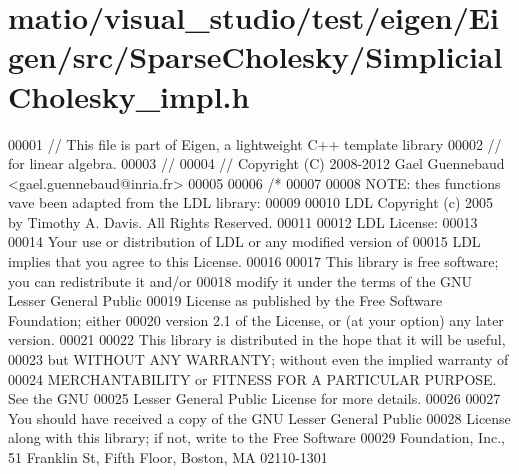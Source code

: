 \hypertarget{matio_2visual__studio_2test_2eigen_2_eigen_2src_2_sparse_cholesky_2_simplicial_cholesky__impl_8h_source}{}\section{matio/visual\+\_\+studio/test/eigen/\+Eigen/src/\+Sparse\+Cholesky/\+Simplicial\+Cholesky\+\_\+impl.h}
\label{matio_2visual__studio_2test_2eigen_2_eigen_2src_2_sparse_cholesky_2_simplicial_cholesky__impl_8h_source}

\begin{DoxyCode}
00001 \textcolor{comment}{// This file is part of Eigen, a lightweight C++ template library}
00002 \textcolor{comment}{// for linear algebra.}
00003 \textcolor{comment}{//}
00004 \textcolor{comment}{// Copyright (C) 2008-2012 Gael Guennebaud <gael.guennebaud@inria.fr>}
00005 
00006 \textcolor{comment}{/*}
00007 \textcolor{comment}{}
00008 \textcolor{comment}{NOTE: thes functions vave been adapted from the LDL library:}
00009 \textcolor{comment}{}
00010 \textcolor{comment}{LDL Copyright (c) 2005 by Timothy A. Davis.  All Rights Reserved.}
00011 \textcolor{comment}{}
00012 \textcolor{comment}{LDL License:}
00013 \textcolor{comment}{}
00014 \textcolor{comment}{    Your use or distribution of LDL or any modified version of}
00015 \textcolor{comment}{    LDL implies that you agree to this License.}
00016 \textcolor{comment}{}
00017 \textcolor{comment}{    This library is free software; you can redistribute it and/or}
00018 \textcolor{comment}{    modify it under the terms of the GNU Lesser General Public}
00019 \textcolor{comment}{    License as published by the Free Software Foundation; either}
00020 \textcolor{comment}{    version 2.1 of the License, or (at your option) any later version.}
00021 \textcolor{comment}{}
00022 \textcolor{comment}{    This library is distributed in the hope that it will be useful,}
00023 \textcolor{comment}{    but WITHOUT ANY WARRANTY; without even the implied warranty of}
00024 \textcolor{comment}{    MERCHANTABILITY or FITNESS FOR A PARTICULAR PURPOSE.  See the GNU}
00025 \textcolor{comment}{    Lesser General Public License for more details.}
00026 \textcolor{comment}{}
00027 \textcolor{comment}{    You should have received a copy of the GNU Lesser General Public}
00028 \textcolor{comment}{    License along with this library; if not, write to the Free Software}
00029 \textcolor{comment}{    Foundation, Inc., 51 Franklin St, Fifth Floor, Boston, MA  02110-1301}

\end{DoxyCode}
